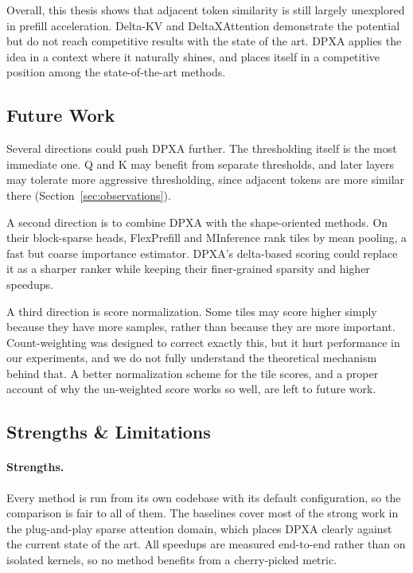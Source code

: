 Overall, this thesis shows that adjacent token similarity is still largely unexplored in prefill acceleration. Delta-KV and DeltaXAttention demonstrate the potential but do not reach competitive results with the state of the art. DPXA applies the idea in a context where it naturally shines, and places itself in a competitive position among the state-of-the-art methods.






\subsection{Future Work}

Several directions could push DPXA further. The thresholding itself is the most immediate one. Q and K may benefit from separate thresholds, and later layers may tolerate more aggressive thresholding, since adjacent tokens are more similar there (Section~\ref{sec:observations}).

A second direction is to combine DPXA with the shape-oriented methods. On their block-sparse heads, FlexPrefill and MInference rank tiles by mean pooling, a fast but coarse importance estimator. DPXA's delta-based scoring could replace it as a sharper ranker while keeping their finer-grained sparsity and higher speedups.

A third direction is score normalization. Some tiles may score higher simply because they have more samples, rather than because they are more important. Count-weighting was designed to correct exactly this, but it hurt performance in our experiments, and we do not fully understand the theoretical mechanism behind that. A better normalization scheme for the tile scores, and a proper account of why the un-weighted score works so well, are left to future work.



\subsection{Strengths \& Limitations}

\paragraph{Strengths.}
Every method is run from its own codebase with its default configuration, so the comparison is fair to all of them. The baselines cover most of the strong work in the plug-and-play sparse attention domain, which places DPXA clearly against the current state of the art. All speedups are measured end-to-end rather than on isolated kernels, so no method benefits from a cherry-picked metric.

